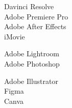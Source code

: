 \documentclass[]{main}
\begin{document}
\begin{minipage}[t]{0.33\textwidth}
\textbullet{} Davinci Resolve \\
\textbullet{} Adobe Premiere Pro \\
\textbullet{} Adobe After Effects \\
\textbullet{} iMovie


\sectionsep

\textbullet{} Adobe Lightroom \\
\textbullet{} Adobe Photoshop \\

\sectionsep

\textbullet{} Adobe Illustrator \\
\textbullet{} Figma \\
\textbullet{} Canva \\

\sectionsep

%
%

\end{minipage} 
\hfill
\end{document}
